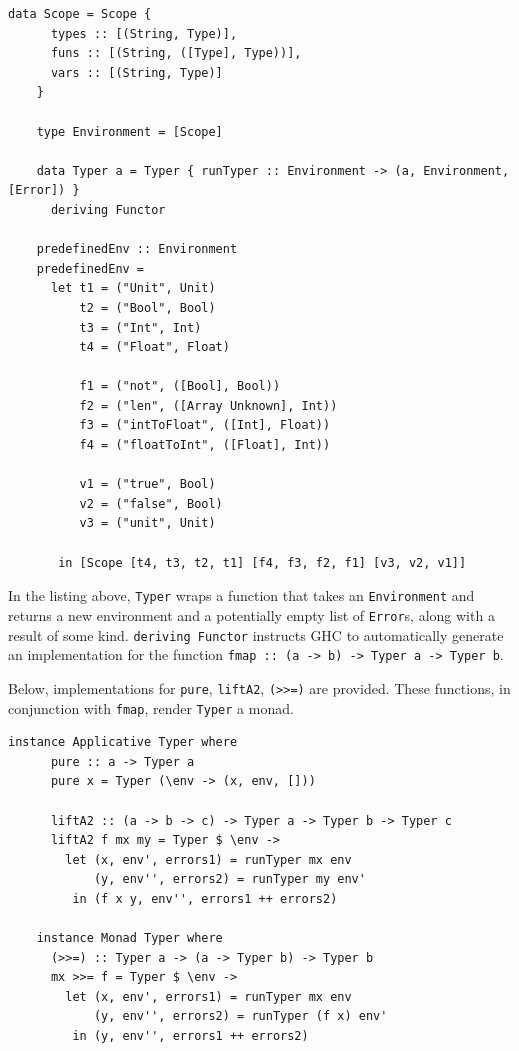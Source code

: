 \documentclass[UdineBachThesis,american,11pt]{PhdThesis}
\begin{document}
  \begin{Verbatim}[gobble=4,fontsize=\small]
    data Scope = Scope {
      types :: [(String, Type)],
      funs :: [(String, ([Type], Type))],
      vars :: [(String, Type)]
    }

    type Environment = [Scope]

    data Typer a = Typer { runTyper :: Environment -> (a, Environment, [Error]) }
      deriving Functor

    predefinedEnv :: Environment
    predefinedEnv =
      let t1 = ("Unit", Unit)
          t2 = ("Bool", Bool)
          t3 = ("Int", Int)
          t4 = ("Float", Float)

          f1 = ("not", ([Bool], Bool))
          f2 = ("len", ([Array Unknown], Int))
          f3 = ("intToFloat", ([Int], Float))
          f4 = ("floatToInt", ([Float], Int))

          v1 = ("true", Bool)
          v2 = ("false", Bool)
          v3 = ("unit", Unit)

       in [Scope [t4, t3, t2, t1] [f4, f3, f2, f1] [v3, v2, v1]]
  \end{Verbatim}

  In the listing above, \mbox{\texttt{Typer}} wraps a function that takes an
  \mbox{\texttt{Environment}} and returns a new environment and a potentially
  empty list of \mbox{\texttt{Error}s}, along with a result of some kind.
  \mbox{\texttt{deriving Functor}} instructs GHC to automatically generate an
  implementation for the function
  \mbox{\texttt{fmap :: (a -> b) -> Typer a -> Typer b}}.

  Below, implementations for \mbox{\texttt{pure}}, \mbox{\texttt{liftA2}},
  \mbox{\texttt{(>>=)}} are provided. These functions, in conjunction with
  \mbox{\texttt{fmap}}, render \mbox{\texttt{Typer}} a monad.

  \begin{Verbatim}[gobble=4,fontsize=\small]
    instance Applicative Typer where
      pure :: a -> Typer a
      pure x = Typer (\env -> (x, env, []))

      liftA2 :: (a -> b -> c) -> Typer a -> Typer b -> Typer c
      liftA2 f mx my = Typer $ \env ->
        let (x, env', errors1) = runTyper mx env
            (y, env'', errors2) = runTyper my env'
         in (f x y, env'', errors1 ++ errors2)

    instance Monad Typer where
      (>>=) :: Typer a -> (a -> Typer b) -> Typer b
      mx >>= f = Typer $ \env ->
        let (x, env', errors1) = runTyper mx env
            (y, env'', errors2) = runTyper (f x) env'
         in (y, env'', errors1 ++ errors2)
  \end{Verbatim}
\end{document}
